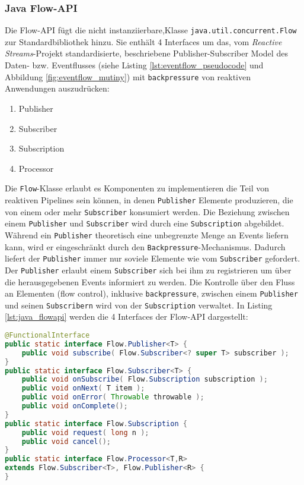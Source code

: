\subsubsection{Java Flow-API}
\label{subsection:java_flow_api}
Die Flow-API fügt die nicht instanziierbare,Klasse \verb|java.util.concurrent.Flow| zur Standardbibliothek hinzu. Sie enthält 4 Interfaces um das,
vom \textit{Reactive Streams}-Projekt standardisierte, beschriebene Publisher-Subscriber Model des Daten- bzw. Eventflusses
(siehe Listing \ref{lst:eventflow_pseudocode} und Abbildung \ref{fig:eventflow_mutiny}) mit \verb|backpressure|
von reaktiven Anwendungen auszudrücken:
\begin{enumerate}
  \item Publisher
  \item Subscriber
  \item Subscription
  \item Processor
\end{enumerate}

Die \verb|Flow|-Klasse erlaubt es Komponenten zu implementieren die Teil von reaktiven Pipelines sein können, in denen
\verb|Publisher| Elemente produzieren, die von einem oder mehr \verb|Subscriber| konsumiert werden. Die Beziehung zwischen einem
\verb|Publisher| und \verb|Subscriber| wird durch eine \verb|Subscription| abgebildet.
Während ein \verb|Publisher| theoretisch eine unbegrenzte Menge an Events liefern kann, wird er eingeschränkt durch den
\verb|Backpressure|-Mechanismus. Dadurch liefert der \verb|Publisher| immer nur soviele Elemente wie vom \verb|Subscriber| gefordert.
Der \verb|Publisher| erlaubt einem \verb|Subscriber| sich bei ihm zu registrieren um über die herausgegebenen Events informiert zu werden.
Die Kontrolle über den Fluss an Elementen (flow control), inklusive \verb|backpressure|, zwischen einem \verb|Publisher| und seinen \verb|Subscribern|
wird von der \verb|Subscription| verwaltet.
In Listing \ref{lst:java_flowapi} werden die 4 Interfaces der Flow-API dargestellt:
\begin{lstlisting}[language=java, caption=Die Klasse java.util.concurrent.Flow, captionpos=b, label=lst:java_flowapi]
@FunctionalInterface
public static interface Flow.Publisher<T> {
	public void subscribe( Flow.Subscriber<? super T> subscriber );
}
public static interface Flow.Subscriber<T> {
	public void onSubscribe( Flow.Subscription subscription );
	public void onNext( T item );
	public void onError( Throwable throwable );
	public void onComplete();
}
public static interface Flow.Subscription {
	public void request( long n );
	public void cancel();
}
public static interface Flow.Processor<T,R>
extends Flow.Subscriber<T>, Flow.Publisher<R> {
}
\end{lstlisting}\parencite[Kapitel 5.11]{JavaSE9StandardBibliothek}

